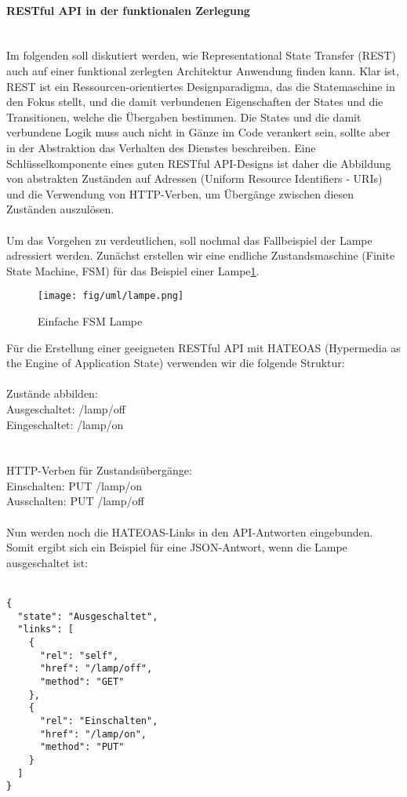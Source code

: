 \documentclass[../vs-script-first-v01.tex]{subfiles}
\begin{document}
\paragraph{RESTful API in der funktionalen Zerlegung\\\\}
Im folgenden soll diskutiert werden, wie Representational State Transfer (REST) auch auf einer funktional zerlegten Architektur Anwendung finden kann.  Klar ist, REST ist ein Ressourcen-orientiertes Designparadigma, das die Statemaschine in den Fokus stellt, und die damit verbundenen Eigenschaften der States und die Transitionen, welche die Übergaben bestimmen. Die States und die damit verbundene Logik muss auch nicht in Gänze im Code verankert sein, sollte aber in der Abstraktion das Verhalten des Dienstes beschreiben. Eine Schlüsselkomponente eines guten RESTful API-Designs ist daher die Abbildung von abstrakten Zuständen auf Adressen (Uniform Resource Identifiers - URIs) und die Verwendung von HTTP-Verben, um Übergänge zwischen diesen Zuständen auszulösen. 
\\\\
Um das Vorgehen zu verdeutlichen, soll nochmal das Fallbeispiel der Lampe adressiert werden. Zunächst erstellen wir eine endliche Zustandsmaschine (Finite State Machine, FSM) für das Beispiel einer Lampe\ref{fig:lampe}.

\begin{figure}[!ht]
  \centering
  \texttt{[image: fig/uml/lampe.png]}
  \caption{Einfache FSM Lampe}
  \label{fig:lampe}
\end{figure}
Für die Erstellung einer geeigneten RESTful API mit HATEOAS (Hypermedia as the Engine of Application State) verwenden wir die folgende Struktur:
\\\\
Zustände abbilden:
\\
Ausgeschaltet: /lamp/off\\
Eingeschaltet: /lamp/on\\
\\\\
HTTP-Verben für Zustandsübergänge:
\\
Einschalten: PUT /lamp/on\\
Ausschalten: PUT /lamp/off
\\\\
Nun werden noch die HATEOAS-Links in den API-Antworten eingebunden. Somit ergibt sich ein Beispiel für eine JSON-Antwort, wenn die Lampe ausgeschaltet ist:\\\\
\noindent\begin{minipage}{\textwidth}
\begin{lstlisting}[caption={Fallbeispiel REST - aus},captionpos=b,label={lst:rest_on}]
{
  "state": "Ausgeschaltet",
  "links": [
    {
      "rel": "self",
      "href": "/lamp/off",
      "method": "GET"
    },
    {
      "rel": "Einschalten",
      "href": "/lamp/on",
      "method": "PUT"
    }
  ]
}
\end{lstlisting}
\end{minipage}
\end{document}
